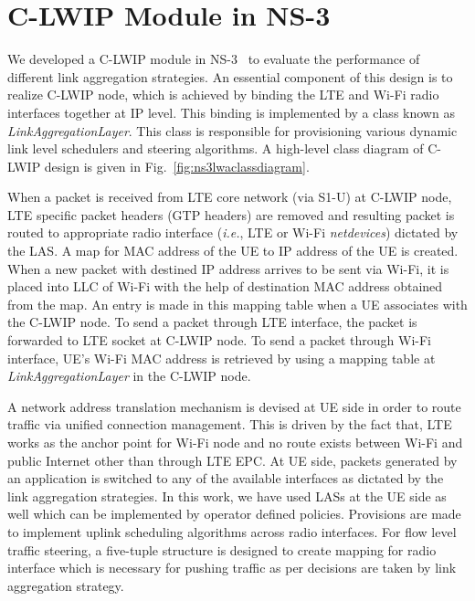 \documentclass[conference]{IEEEtran}
\begin{document}
\section{C-LWIP Module in NS-3}
\label{sec:lwans3}
We developed a C-LWIP module in NS-3~\cite{ns3} to evaluate the performance of different link aggregation strategies. An essential component of this design is to realize C-LWIP node, which is achieved by binding the LTE and Wi-Fi radio interfaces together at IP level. This binding is implemented by a class known as \textit{LinkAggregationLayer}. This class is responsible for provisioning various dynamic link level schedulers and steering algorithms. A high-level class diagram of C-LWIP design is given in Fig.~\ref{fig:ns3lwaclassdiagram}. 

When a packet is received from LTE core network (via S1-U) at C-LWIP node, LTE specific packet headers (GTP headers) are removed and resulting packet is routed to appropriate radio interface (\emph{i.e.}, LTE or Wi-Fi \textit{netdevices}) dictated by the LAS. A map for MAC address of the UE to IP address of the UE is created. When a new packet with destined IP address arrives to be sent via Wi-Fi, it is placed into LLC of Wi-Fi with the help of destination MAC address obtained from the map. An entry is made in this mapping table when a UE associates with the C-LWIP node. To send a packet through LTE interface, the packet is forwarded to LTE socket at C-LWIP node. 
To send a packet through Wi-Fi interface, UE's Wi-Fi MAC address is retrieved by using a mapping table at \textit{LinkAggregationLayer} in the C-LWIP node.

A network address translation mechanism is devised at UE side in order to route traffic via unified connection management. This is driven by the fact that, LTE works as the anchor point for Wi-Fi node and no route exists between Wi-Fi and public Internet other than through LTE EPC. At UE side, packets generated by an application is switched to any of the available interfaces as dictated by the link aggregation strategies. In this work, we have used LASs at the UE side as well which can be implemented by operator defined policies. Provisions are made to implement uplink scheduling algorithms across radio interfaces. For flow level traffic steering, a five-tuple structure is designed to create mapping for radio interface which is necessary for pushing traffic as per decisions are taken by link aggregation strategy. 
\end{document}
